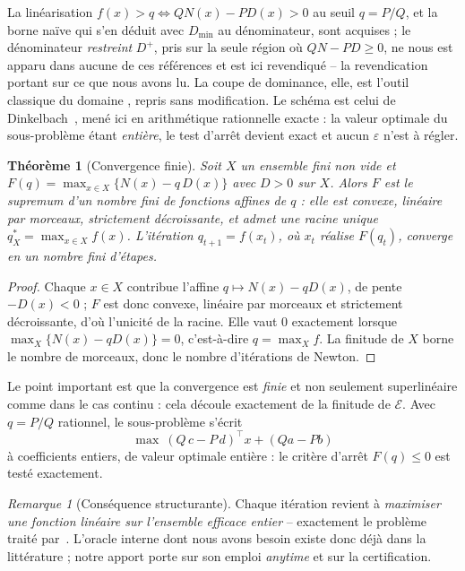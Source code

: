 \documentclass[11pt,a4paper]{article}
\theoremstyle{plain}
\newtheorem{theorem}{Théorème}
\theoremstyle{remark}
\newtheorem{remark}{Remarque}
\newcommand{\Ecal}{\mathcal{E}}
\begin{document}
La linéarisation $f(x)>q \iff QN(x)-PD(x)>0$ au seuil $q=P/Q$, et la borne
naïve qui s'en déduit avec $D_{\min}$ au dénominateur, sont acquises
\cite{dinkelbach1967,martos1964,cambini1992} ; le dénominateur
\emph{restreint} $D^{+}$, pris sur la seule région où $QN-PD\ge 0$, ne nous
est apparu dans aucune de ces références et est ici revendiqué -- la
revendication portant sur ce que nous avons lu. La coupe de dominance, elle,
est l'outil classique du domaine \cite{chergui2008,jorge2009,sylva2004},
repris sans modification. Le schéma est celui de
Dinkelbach~\cite{dinkelbach1967}, mené ici en
arithmétique rationnelle exacte : la valeur optimale du sous-problème étant
\emph{entière}, le test d'arrêt devient exact et aucun $\varepsilon$ n'est à
régler.

\begin{theorem}[Convergence finie]\label{th:dink}
Soit $X$ un ensemble fini non vide et
$F(q)=\max_{x\in X}\{N(x)-q\,D(x)\}$ avec $D>0$ sur $X$. Alors $F$ est le
supremum d'un nombre fini de fonctions affines de $q$ : elle est convexe,
linéaire par morceaux, strictement décroissante, et admet une racine unique
$q^{\ast}_X=\max_{x\in X}f(x)$. L'itération $q_{t+1}=f(x_t)$, où $x_t$
réalise $F(q_t)$, converge en un nombre \emph{fini} d'étapes.
\end{theorem}

\begin{proof}
Chaque $x\in X$ contribue l'affine $q\mapsto N(x)-qD(x)$, de pente
$-D(x)<0$ ; $F$ est donc convexe, linéaire par morceaux et strictement
décroissante, d'où l'unicité de la racine. Elle vaut $0$ exactement lorsque
$\max_X\{N(x)-qD(x)\}=0$, c'est-à-dire $q=\max_X f$. La finitude de $X$
borne le nombre de morceaux, donc le nombre d'itérations de Newton.
\end{proof}

\noindent
Le point important est que la convergence est \emph{finie} et non seulement
superlinéaire comme dans le cas continu : cela découle exactement de la
finitude de $\Ecal$. Avec $q=P/Q$ rationnel, le sous-problème s'écrit
\[
  \max\ (Q\,c-P\,d)^{\!\top}x+(Qa-Pb)
\]
à coefficients entiers, de valeur optimale entière : le critère d'arrêt
$F(q)\le 0$ est testé exactement.

\begin{remark}[Conséquence structurante]\label{rem:oracle}
Chaque itération revient à \emph{maximiser une fonction linéaire sur
l'ensemble efficace entier} -- exactement le problème traité
par~\cite{zerdani2011}. L'oracle interne dont nous avons besoin existe donc
déjà dans la littérature ; notre apport porte sur son emploi \emph{anytime}
et sur la certification.
\end{remark}
\end{document}
